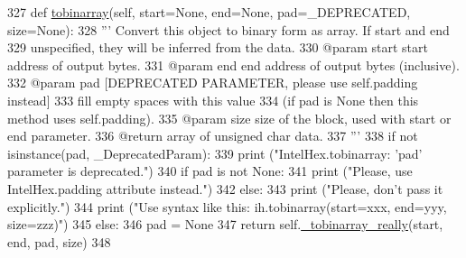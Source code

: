 \begin{DoxyCode}
327     \textcolor{keyword}{def }\hyperlink{classsoftware_1_1chipwhisperer_1_1capture_1_1utils_1_1IntelHex_1_1IntelHex_a328f8941824c4b535fb8bafbc1dd9add}{tobinarray}(self, start=None, end=None, pad=\_DEPRECATED, size=None):
328         \textcolor{stringliteral}{''' Convert this object to binary form as array. If start and end }
329 \textcolor{stringliteral}{        unspecified, they will be inferred from the data.}
330 \textcolor{stringliteral}{        @param  start   start address of output bytes.}
331 \textcolor{stringliteral}{        @param  end     end address of output bytes (inclusive).}
332 \textcolor{stringliteral}{        @param  pad     [DEPRECATED PARAMETER, please use self.padding instead]}
333 \textcolor{stringliteral}{                        fill empty spaces with this value}
334 \textcolor{stringliteral}{                        (if pad is None then this method uses self.padding).}
335 \textcolor{stringliteral}{        @param  size    size of the block, used with start or end parameter.}
336 \textcolor{stringliteral}{        @return         array of unsigned char data.}
337 \textcolor{stringliteral}{        '''}
338         \textcolor{keywordflow}{if} \textcolor{keywordflow}{not} isinstance(pad, \_DeprecatedParam):
339             \textcolor{keywordflow}{print} (\textcolor{stringliteral}{"IntelHex.tobinarray: 'pad' parameter is deprecated."})
340             \textcolor{keywordflow}{if} pad \textcolor{keywordflow}{is} \textcolor{keywordflow}{not} \textcolor{keywordtype}{None}:
341                 \textcolor{keywordflow}{print} (\textcolor{stringliteral}{"Please, use IntelHex.padding attribute instead."})
342             \textcolor{keywordflow}{else}:
343                 \textcolor{keywordflow}{print} (\textcolor{stringliteral}{"Please, don't pass it explicitly."})
344                 \textcolor{keywordflow}{print} (\textcolor{stringliteral}{"Use syntax like this: ih.tobinarray(start=xxx, end=yyy, size=zzz)"})
345         \textcolor{keywordflow}{else}:
346             pad = \textcolor{keywordtype}{None}
347         \textcolor{keywordflow}{return} self.\hyperlink{classsoftware_1_1chipwhisperer_1_1capture_1_1utils_1_1IntelHex_1_1IntelHex_a080abef69e58593b69483649b1838a74}{\_tobinarray\_really}(start, end, pad, size)
348 
\end{DoxyCode}
\hypertarget{classsoftware_1_1chipwhisperer_1_1capture_1_1utils_1_1IntelHex_1_1IntelHex_a1591d7944d6232ffbe20231e5b3547e0}{}
